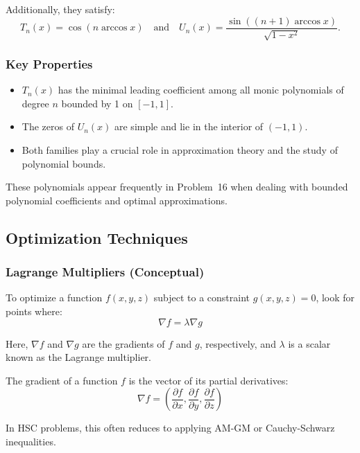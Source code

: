 \documentclass[12pt]{article}
\begin{document}
Additionally, they satisfy:
\[ T_n(x) = \cos(n\arccos x) \quad \text{and} \quad U_n(x) = \frac{\sin((n+1)\arccos x)}{\sqrt{1-x^2}}. \]

\subsubsection{Key Properties}
\begin{itemize}[leftmargin=*]
  \item $T_n(x)$ has the minimal leading coefficient among all monic polynomials of degree $n$ bounded by 1 on $[-1,1]$.
  \item The zeros of $U_n(x)$ are simple and lie in the interior of $(-1,1)$.
  \item Both families play a crucial role in approximation theory and the study of polynomial bounds.
\end{itemize}

These polynomials appear frequently in Problem~16 when dealing with bounded polynomial coefficients and optimal approximations.

\subsection{Optimization Techniques}

\subsubsection{Lagrange Multipliers (Conceptual)}

\begin{definition}
To optimize a function $f(x,y,z)$ subject to a constraint $g(x,y,z) = 0$, look for points where:
\[\nabla f = \lambda \nabla g\]

Here, $\nabla f$ and $\nabla g$ are the gradients of $f$ and $g$, respectively, 
and $\lambda$ is a scalar known as the Lagrange multiplier.

The gradient of a function $f$ is the vector of its partial derivatives:
\[\nabla f = \left( \frac{\partial f}{\partial x}, \frac{\partial f}{\partial y}, \frac{\partial f}{\partial z} \right)\]

\end{definition}

In HSC problems, this often reduces to applying AM-GM or Cauchy-Schwarz inequalities.
\end{document}
